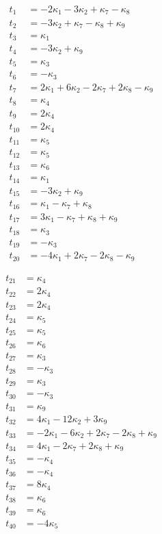 \documentclass[11pt]{article}
\begin{document}
\begin{align}
t_{1} &=-2\kappa_1 - 3\kappa_2 + \kappa_7 - \kappa_8\\
t_{2} &=-3\kappa_2 + \kappa_7 - \kappa_8 + \kappa_9\\
t_{3} &=\kappa_1\\
t_{4} &=-3\kappa_2 + \kappa_9\\
t_{5} &=\kappa_3\\
t_{6} &=-\kappa_3\\
t_{7} &=2\kappa_1 + 6\kappa_2 - 2\kappa_7 + 2\kappa_8 - \kappa_9\\
t_{8} &=\kappa_4\\
t_{9} &=2\kappa_4\\
t_{10} &=2\kappa_4\\
t_{11} &=\kappa_5\\
t_{12} &=\kappa_5\\
t_{13} &=\kappa_6\\
t_{14} &=\kappa_1\\
t_{15} &=-3\kappa_2 + \kappa_9\\
t_{16} &=\kappa_1 - \kappa_7 + \kappa_8\\
t_{17} &=3\kappa_1 - \kappa_7 + \kappa_8 + \kappa_9\\
t_{18} &=\kappa_3\\
t_{19} &=-\kappa_3\\
t_{20} &=-4\kappa_1 + 2\kappa_7 - 2\kappa_8 - \kappa_9
\end{align}

\begin{align}
t_{21} &=\kappa_4\\
t_{22} &=2\kappa_4\\
t_{23} &=2\kappa_4\\
t_{24} &=\kappa_5\\
t_{25} &=\kappa_5\\
t_{26} &=\kappa_6\\
t_{27} &=\kappa_3\\
t_{28} &=-\kappa_3\\
t_{29} &=\kappa_3\\
t_{30} &=-\kappa_3\\
t_{31} &=\kappa_9\\
t_{32} &=4\kappa_1 - 12\kappa_2 + 3\kappa_9\\
t_{33} &=-2\kappa_1 - 6\kappa_2 + 2\kappa_7 - 2\kappa_8 + \kappa_9\\
t_{34} &=4\kappa_1 - 2\kappa_7 + 2\kappa_8 + \kappa_9\\
t_{35} &=-\kappa_4\\
t_{36} &=-\kappa_4\\
t_{37} &=8\kappa_4\\
t_{38} &=\kappa_6\\
t_{39} &=\kappa_6\\
t_{40} &=-4\kappa_5
\end{align}
\end{document}
